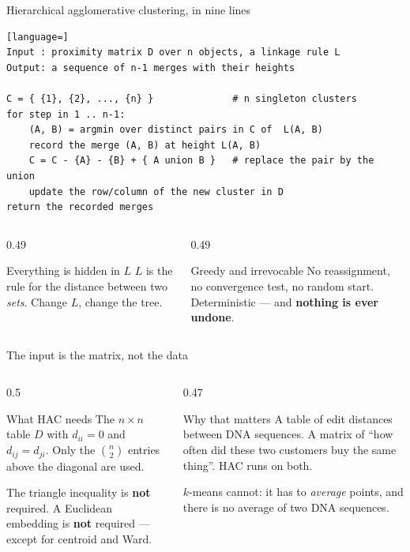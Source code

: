 \documentclass[aspectratio=169]{beamer}
\begin{document}
\begin{frame}[fragile,shrink=18]{Hierarchical agglomerative clustering, in nine lines}
\begin{lstlisting}[language=]
Input : proximity matrix D over n objects, a linkage rule L
Output: a sequence of n-1 merges with their heights

C = { {1}, {2}, ..., {n} }              # n singleton clusters
for step in 1 .. n-1:
    (A, B) = argmin over distinct pairs in C of  L(A, B)
    record the merge (A, B) at height L(A, B)
    C = C - {A} - {B} + { A union B }   # replace the pair by the union
    update the row/column of the new cluster in D
return the recorded merges
\end{lstlisting}
  \begin{columns}[T]
    \begin{column}{0.49\textwidth}
      \begin{exampleblock}{Everything is hidden in $L$}
        \small $L$ is the rule for the distance between two \emph{sets}.
        Change $L$, change the tree.
      \end{exampleblock}
    \end{column}
    \begin{column}{0.49\textwidth}
      \begin{alertblock}{Greedy and irrevocable}
        \small No reassignment, no convergence test, no random start.
        Deterministic --- and \textbf{nothing is ever undone}.
      \end{alertblock}
    \end{column}
  \end{columns}
\end{frame}

\begin{frame}{The input is the matrix, not the data}
  \begin{columns}[T]
    \begin{column}{0.5\textwidth}
      \begin{block}{What HAC needs}
        The $n \times n$ table $D$ with $d_{ii}=0$ and $d_{ij}=d_{ji}$. Only
        the $\binom{n}{2}$ entries above the diagonal are used.

        \medskip
        The triangle inequality is \textbf{not} required. A Euclidean
        embedding is \textbf{not} required --- except for centroid and Ward.
      \end{block}
    \end{column}
    \begin{column}{0.47\textwidth}
      \begin{exampleblock}{Why that matters}
        A table of edit distances between DNA sequences. A matrix of ``how
        often did these two customers buy the same thing''. HAC runs on both.

        \medskip
        $k$-means cannot: it has to \emph{average} points, and there is no
        average of two DNA sequences.
      \end{exampleblock}
    \end{column}
  \end{columns}
\end{frame}
\end{document}
